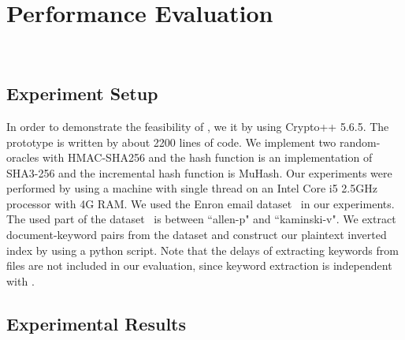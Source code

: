 \section{Performance Evaluation}~\label{sec:experiments}


\subsection{Experiment Setup}
In order to demonstrate the feasibility of \name, we  it by using Crypto++ 5.6.5. The prototype is written by about 2200 lines of code. %
 We implement two random-oracles with HMAC-SHA256 and the hash function is an implementation of SHA3-256 and the incremental hash function is MuHash.
%
Our experiments were performed by using a machine with single thread on an Intel Core i5 2.5GHz processor with 4G RAM. %
We used the Enron email dataset~\cite{enron_email} in our experiments. The used part of the dataset~\cite{enron_email} is between ``allen-p" and ``kaminski-v". We extract document-keyword pairs from the dataset and construct our plaintext inverted index by using a python script. Note that the delays of extracting keywords from files are not included in our evaluation, since keyword extraction is independent with \name.


\subsection{Experimental Results}


